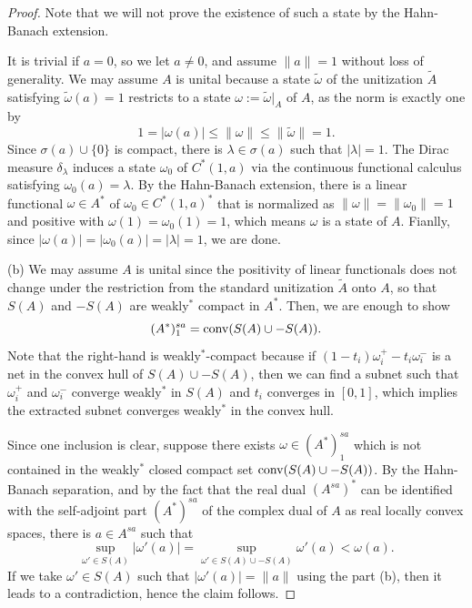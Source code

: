 \documentclass{../../large}
\begin{document}
\begin{proof}
Note that we will not prove the existence of such a state by the Hahn-Banach extension.


It is trivial if $a=0$, so we let $a\ne0$, and assume $\|a\|=1$ without loss of generality.
We may assume $A$ is unital because a state $\tilde\omega$ of the unitization $\tilde A$ satisfying $\tilde\omega(a)=1$ restricts to a state $\omega:=\tilde\omega|_A$ of $A$, as the norm is exactly one by
\[1=|\omega(a)|\le\|\omega\|\le\|\tilde\omega\|=1.\]
Since $\sigma(a)\cup\{0\}$ is compact, there is $\lambda\in\sigma(a)$ such that $|\lambda|=1$.
The Dirac measure $\delta_\lambda$ induces a state $\omega_0$ of $C^*(1,a)$ via the continuous functional calculus satisfying $\omega_0(a)=\lambda$.
By the Hahn-Banach extension, there is a linear functional $\omega\in A^*$ of $\omega_0\in C^*(1,a)^*$ that is normalized as $\|\omega\|=\|\omega_0\|=1$ and positive with $\omega(1)=\omega_0(1)=1$, which means $\omega$ is a state of $A$.
Fianlly, since $|\omega(a)|=|\omega_0(a)|=|\lambda|=1$, we are done.

(b)
We may assume $A$ is unital since the positivity of linear functionals does not change under the restriction from the standard unitization $\tilde A$ onto $A$, so that $S(A)$ and $-S(A)$ are weakly$^*$ compact in $A^*$.
Then, we are enough to show
\[(A^*)^{sa}_1=\operatorname{conv}(S(A)\cup-S(A)).\]
Note that the right-hand is weakly$^*$-compact because if $(1-t_i)\omega_i^+-t_i\omega_i^-$ is a net in the convex hull of $S(A)\cup-S(A)$, then we can find a subnet such that $\omega_i^+$ and $\omega_i^-$ converge weakly$^*$ in $S(A)$ and $t_i$ converges in $[0,1]$, which implies the extracted subnet converges weakly$^*$ in the convex hull.

Since one inclusion is clear, suppose there exists $\omega\in(A^*)^{sa}_1$ which is not contained in the weakly$^*$ closed compact set $\operatorname{conv}(S(A)\cup-S(A))$.
By the Hahn-Banach separation, and by the fact that the real dual $(A^{sa})^*$ can be identified with the self-adjoint part $(A^*)^{sa}$ of the complex dual of $A$ as real locally convex spaces, there is $a\in A^{sa}$ such that
\[\sup_{\omega'\in S(A)}|\omega'(a)|=\sup_{\omega'\in S(A)\cup-S(A)}\omega'(a)<\omega(a).\]
If we take $\omega'\in S(A)$ such that $|\omega'(a)|=\|a\|$ using the part (b), then it leads to a contradiction, hence the claim follows.
\end{proof}
\end{document}
